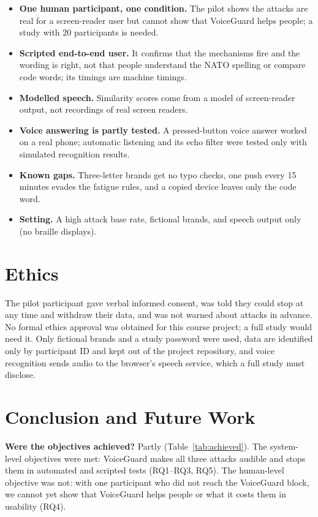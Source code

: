 \documentclass[conference]{IEEEtran}
\begin{document}
\begin{itemize}
\item \textbf{One human participant, one condition.} The pilot shows the attacks are real for a screen-reader user but cannot show that VoiceGuard helps people; a study with 20 participants is needed.
\item \textbf{Scripted end-to-end user.} It confirms that the mechanisms fire and the wording is right, not that people understand the NATO spelling or compare code words; its timings are machine timings.
\item \textbf{Modelled speech.} Similarity scores come from a model of screen-reader output, not recordings of real screen readers.
\item \textbf{Voice answering is partly tested.} A pressed-button voice answer worked on a real phone; automatic listening and its echo filter were tested only with simulated recognition results.
\item \textbf{Known gaps.} Three-letter brands get no typo checks, one push every 15 minutes evades the fatigue rules, and a copied device leaves only the code word.
\item \textbf{Setting.} A high attack base rate, fictional brands, and speech output only (no braille displays).
\end{itemize}

\section{Ethics}

The pilot participant gave verbal informed consent, was told they could stop at any time and withdraw their data, and was not warned about attacks in advance. No formal ethics approval was obtained for this course project; a full study would need it. Only fictional brands and a study password were used, data are identified only by participant ID and kept out of the project repository, and voice recognition sends audio to the browser's speech service, which a full study must disclose.

\section{Conclusion and Future Work}

\textbf{Were the objectives achieved?} Partly (Table~\ref{tab:achieved}). The system-level objectives were met: VoiceGuard makes all three attacks audible and stops them in automated and scripted tests (RQ1--RQ3, RQ5). The human-level objective was not: with one participant who did not reach the VoiceGuard block, we cannot yet show that VoiceGuard helps people or what it costs them in usability (RQ4).
\end{document}
